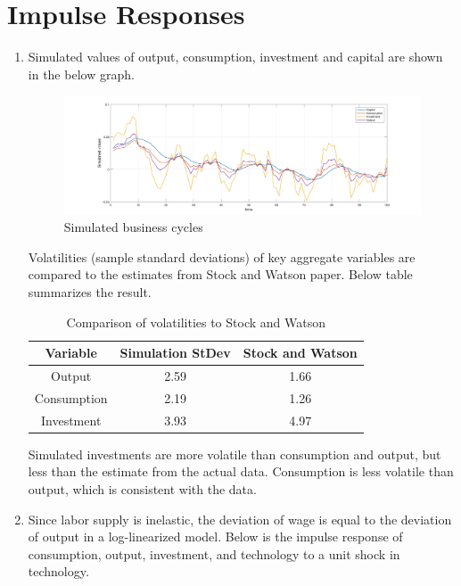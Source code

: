 \documentclass[11pt]{amsart}
\begin{document}
\section{Impulse Responses}
\begin{enumerate}[label = (\alph*)]
	\item Simulated values of output, consumption, investment and capital are shown in the below graph. 
	\begin{figure}[H]
		\centering
		\includegraphics[width=1\textwidth]{5a_Minki.png}
		\caption{Simulated business cycles}
	\end{figure}
    Volatilities (sample standard deviations) of key aggregate variables are compared to the estimates from Stock and Watson paper. Below table summarizes the result. 
    \begin{table}[H]
    	\centering
    	\begin{tabular}{ccc}
    		\hline \hline 
    		 \bf Variable  & \bf Simulation StDev           & \bf Stock and Watson \\
    		\hline 
    	    Output                &  2.59       &   1.66      \\
    		Consumption      &   2.19      &   1.26         \\
    	    Investment         &   3.93      &    4.97       \\
    		\hline
    	\end{tabular}
    	\caption{Comparison of volatilities to Stock and Watson }
    \end{table}
    Simulated investments are more volatile than consumption and output, but less than the estimate from the actual data. Consumption is less volatile than output, which is consistent with the data. 
    
    \item Since labor supply is inelastic, the deviation of wage is equal to the deviation of output in a log-linearized model. Below is the impulse response of consumption, output, investment, and technology to a unit shock in technology. 
    

\end{enumerate}
\end{document}
